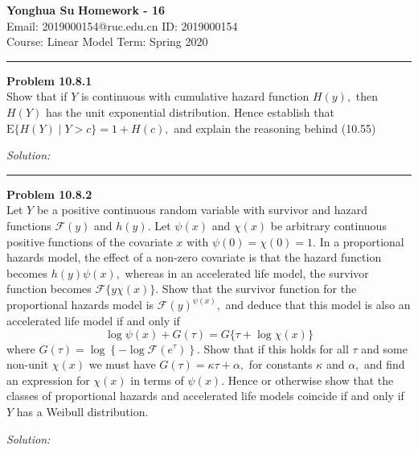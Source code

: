 \documentclass[a4paper, 11pt]{article}
\newenvironment{problem}[2][Problem]
    { \begin{mdframed}[backgroundcolor=gray!20] \textbf{#1 #2} \\}
    {  \end{mdframed}}
\newenvironment{solution}
    {\textit{Solution:}}
    {}
\begin{document}
\noindent
\large\textbf{Yonghua Su} \hfill \textbf{Homework - 16}   \\
Email: 2019000154@ruc.edu.cn \hfill ID: 2019000154 \\
\normalsize Course: Linear Model   \hfill Term: Spring 2020\\
\noindent\rule{7in}{2.8pt}


\begin{problem}{10.8.1}
  Show that if $Y$ is continuous with cumulative hazard function $H(y),$ then $H(Y)$ has the unit exponential distribution. Hence establish that $\mathrm{E}\{H(Y) \mid Y>c\}=1+H(c),$ and explain the reasoning behind (10.55)
\end{problem}
\begin{solution}

\end{solution}

\noindent\rule{7in}{2.8pt}

\begin{problem}{10.8.2}
  Let $Y$ be a positive continuous random variable with survivor and hazard functions $\mathcal{F}(y)$ and $h(y) .$ Let $\psi(x)$ and $\chi(x)$ be arbitrary continuous positive functions of the covariate $x$ with $\psi(0)=\chi(0)=1 .$ In a proportional hazards model, the effect of a non-zero covariate is that the hazard function becomes $h(y) \psi(x),$ whereas in an accelerated life model, the survivor function becomes $\mathcal{F}\{y \chi(x)\} .$ Show that the survivor function for the proportional hazards model is $\mathcal{F}(y)^{\psi(x)},$ and deduce that this model is also an accelerated life model if and only if
  $$
\log \psi(x)+G(\tau)=G\{\tau+\log \chi(x)\}
$$
where $G(\tau)=\log \left\{-\log \mathcal{F}\left(e^{\tau}\right)\right\} .$ Show that if this holds for all $\tau$ and some non-unit $\chi(x)$ we must have $G(\tau)=\kappa \tau+\alpha,$ for constants $\kappa$ and $\alpha,$ and find an expression for $\chi(x)$ in terms of $\psi(x) .$ Hence or otherwise show that the classes of proportional hazards and accelerated life models coincide if and only if $Y$ has a Weibull distribution.
\end{problem}
\begin{solution}

\end{solution}
\end{document}
